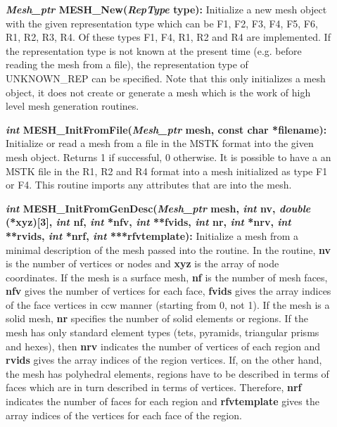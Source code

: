 \documentclass[12pt]{article}
\begin{document}
 
\begin{description}
\item[]{\bf {\em Mesh\_ptr} MESH\_New({\em RepType} type):}
  Initialize a new mesh object with the given representation type
  which can be F1, F2, F3, F4, F5, F6, R1, R2, R3, R4. Of these types
  F1, F4, R1, R2 and R4 are implemented. If the representation type is
  not known at the present time (e.g. before reading the mesh from a
  file), the representation type of UNKNOWN\_REP can be specified.
  Note that this only initializes a mesh object, it does not create or
  generate a mesh which is the work of high level mesh generation
  routines.

\item[]{\bf {\em int} MESH\_InitFromFile({\em Mesh\_ptr} mesh, const
    char *filename):} Initialize or read a mesh from a file in the
  MSTK format into the given mesh object. Returns 1 if successful, 0
  otherwise. It is possible to have a an MSTK file in the R1, R2 and
  R4 format into a mesh initialized as type F1 or F4. This routine
  imports any attributes that are into the mesh.

\item[]{\bf {\em int} MESH\_InitFromGenDesc({\em Mesh\_ptr} mesh, {\em
      int} nv, {\em double} (*xyz)[3], {\em int} nf, {\em int} *nfv, 
    {\em int} **fvids, {\em int} nr, {\em int} *nrv, {\em int}
    **rvids, {\em int} *nrf, {\em int} ***rfvtemplate):} Initialize a
  mesh from a
  minimal description of the mesh passed into the routine. In the
  routine, {\bf nv} is the number of vertices or nodes and {\bf xyz}
  is the array of node coordinates. If the mesh is a surface mesh,
  {\bf nf} is the number of mesh faces, {\bf nfv} gives the number of
  vertices for each face, {\bf fvids} gives the array indices of the
  face vertices in ccw manner (starting from 0, not 1). If the mesh is
  a solid mesh, {\bf nr} specifies the number of solid elements or
  regions. If the mesh has only standard element types (tets,
  pyramids, triangular prisms and hexes), then {\bf nrv} indicates the
  number of vertices of each region and {\bf rvids} gives the array
  indices of the region vertices. If, on the other hand, the mesh has
  polyhedral elements, regions have to be described in terms of faces
  which are in turn described in terms of vertices. Therefore, {\bf
    nrf} indicates the number of faces for each region and {\bf
    rfvtemplate} gives the array indices of the vertices for each face
  of the region.


\end{description}
\end{document}
